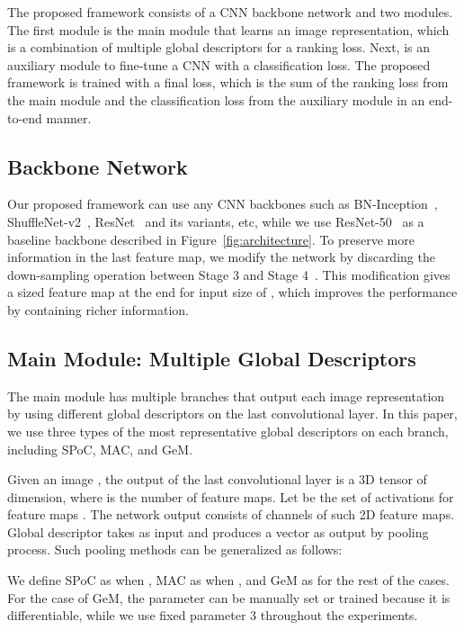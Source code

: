 \documentclass[10pt,twocolumn,letterpaper]{article}
\begin{document}
\begin{CJK}{UTF8}{mj}
The proposed framework consists of a CNN backbone network and two modules.
The first module is the main module that learns an image representation, which is a combination of multiple global descriptors for a ranking loss.
Next, is an auxiliary module to fine-tune a CNN with a classification loss.
The proposed framework is trained with a final loss, which is the sum of the ranking loss from the main module and the classification loss from the auxiliary module in an end-to-end manner.

\subsection{Backbone Network}

Our proposed framework can use any CNN backbones such as BN-Inception~\cite{ioffe2015batch}, ShuffleNet-v2~\cite{ma2018shufflenet}, ResNet~\cite{he2016deep} and its variants, etc, while we use ResNet-50~\cite{he2016deep} as a baseline backbone described in Figure~\ref{fig:architecture}.
To preserve more information in the last feature map, we modify the network by discarding the down-sampling operation between Stage 3 and Stage 4~\cite{dai2018batch, wang2018learning}.
This modification gives a  sized feature map at the end for input size of , which improves the performance by containing richer information.

\subsection{Main Module: Multiple Global Descriptors} \label{sec:main_module}

The main module has multiple branches that output each image representation by using different global descriptors on the last convolutional layer.
In this paper, we use three types of the most representative global descriptors on each branch, including SPoC, MAC, and GeM.

Given an image , the output of the last convolutional layer is a 3D tensor  of  dimension, where  is the number of feature maps.
Let  be the set of  activations for feature maps .
The network output consists of  channels of such 2D feature maps.
Global descriptor takes  as input and produces a vector  as output by pooling process.
Such pooling methods can be generalized as follows:

We define SPoC as  when , MAC as  when , and GeM as  for the rest of the cases.
For the case of GeM, the parameter  can be manually set or trained because it is differentiable, while we use fixed  parameter 3 throughout the experiments.


\end{CJK}
\end{document}
